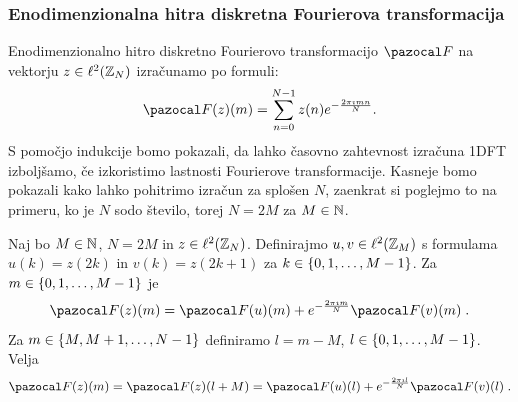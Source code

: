 \subsubsection{Enodimenzionalna hitra diskretna Fourierova transformacija}
%
Enodimenzionalno hitro diskretno Fourierovo transformacijo $\F$ na vektorju $z \in \ell^2(\mathbb Z_N)$ izračunamo po formuli:
%
$$
\F(z)(m) = \sum_{n=0}^{N-1} z(n) e^{-\frac{2\pi\imath mn}{N}}.
$$
%
S pomočjo indukcije bomo pokazali, da lahko časovno zahtevnost izračuna 1DFT iz\-bolj\-ša\-mo, če izkoristimo lastnosti Fourierove transformacije. Kasneje bomo pokazali kako lahko pohitrimo izračun za splošen $N$, zaenkrat si poglejmo to na primeru, ko je $N$ sodo število, torej $N = 2M$ za $M \in \mathbb N$.
%
\begin{lema}
Naj bo $M \in \mathbb N$, $N = 2M$ in $z \in \ell^2(\mathbb Z_N)$. Definirajmo $u, v \in \ell^2(\mathbb Z_M)$ s formulama $u(k) = z(2k)$ in $v(k) = z(2k + 1)$ za $k \in \left\{0, 1, \ldots, M-1\right\}$. Za $m \in \left\{0, 1, \ldots, M-1\right\}$ je
\begin{equation}\label{eq:prviD}
  \F(z)(m) = \F(u)(m) + e^{-\frac{2\pi\imath m}{N}}\F(v)(m) \;.
\end{equation}
Za $m \in \left\{M, M+1, \ldots, N-1\right\}$ definiramo $l = m - M$, $l \in \left\{0, 1, \ldots, M-1\right\}$. Velja
\begin{equation}\label{eq:drugiD}
  \F(z)(m) = \F(z)(l + M) = \F(u)(l) + e^{-\frac{2\pi\imath l}{N}}\F(v)(l) \;.
\end{equation}
\end{lema}
%
